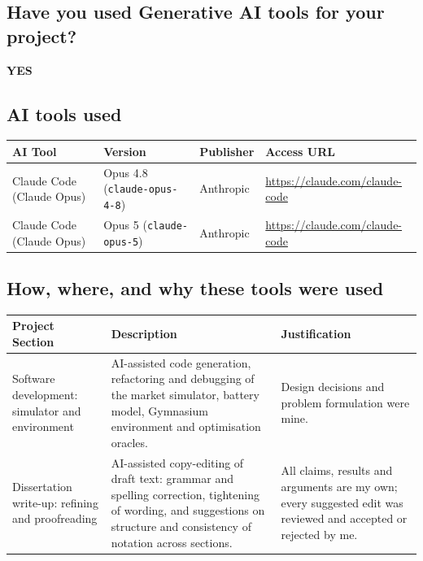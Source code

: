 \documentclass[conference]{IEEEtran}
\begin{document}
\subsection{Have you used Generative AI tools for your project?}

\noindent\textbf{YES}

\subsection{AI tools used}

\begin{center}
\begin{tabularx}{\textwidth}{llXX}
\toprule
AI Tool & Version & Publisher & Access URL \\
\midrule
Claude Code (Claude Opus) & Opus 4.8 (\texttt{claude-opus-4-8}) & Anthropic & \url{https://claude.com/claude-code} \\
Claude Code (Claude Opus) & Opus 5 (\texttt{claude-opus-5}) & Anthropic & \url{https://claude.com/claude-code} \\
\bottomrule
\end{tabularx}
\end{center}

\subsection{How, where, and why these tools were used}

\begin{center}
\begin{tabularx}{\textwidth}{p{}XX}
\toprule
Project Section & Description & Justification \\
\midrule
Software development: simulator and environment &
AI-assisted code generation, refactoring and debugging of the market simulator, battery model, Gymnasium environment and optimisation oracles. &
Design decisions and problem formulation were mine. \\
\addlinespace
Dissertation write-up: refining and proofreading &
AI-assisted copy-editing of draft text: grammar and spelling correction, tightening of wording, and suggestions on structure and consistency of notation across sections. &
All claims, results and arguments are my own; every suggested edit was reviewed and accepted or rejected by me. \\
\bottomrule
\end{tabularx}
\end{center}
\end{document}
